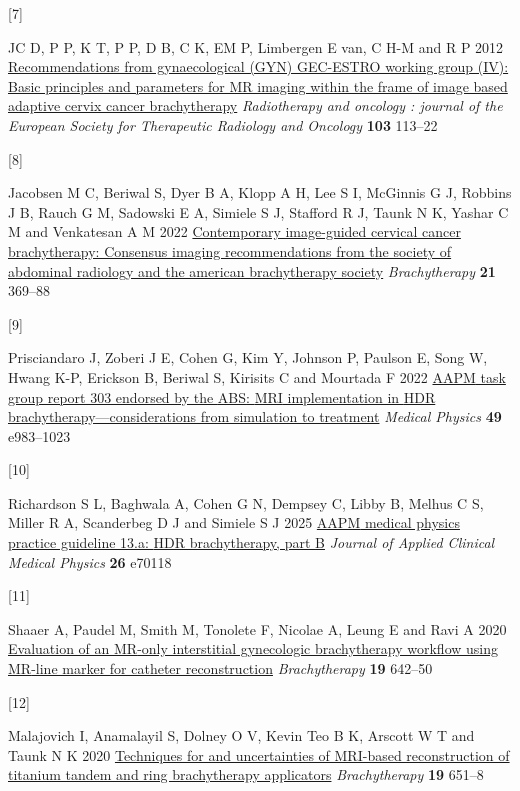 \documentclass[
  11pt,
]{article}
\newlength{\cslhangindent}
\newlength{\csllabelwidth}
\newenvironment{CSLReferences}[2] %
 {\begin{list}{}{%
  \setlength{\itemindent}{0pt}
  \setlength{\leftmargin}{0pt}
  \setlength{\parsep}{0pt}
  \ifodd #1
   \setlength{\leftmargin}{\cslhangindent}
   \setlength{\itemindent}{-1\cslhangindent}
  \fi
  \setlength{\itemsep}{#2\baselineskip}}}
 {\end{list}}
\newcommand{\CSLLeftMargin}[1]{\parbox[t]{\csllabelwidth}{\strut#1\strut}}
\newcommand{\CSLRightInline}[1]{\parbox[t]{\linewidth - \csllabelwidth}{\strut#1\strut}}
\begin{document}
\begin{CSLReferences}{0}{1}
\CSLLeftMargin{{[}7{]} }%
\CSLRightInline{JC D, P P, K T, P P, D B, C K, EM P, Limbergen E van, C
H-M and R P 2012
\href{https://doi.org/10.1016/j.radonc.2011.12.024}{Recommendations from
gynaecological (GYN) GEC-ESTRO working group (IV): Basic principles and
parameters for MR imaging within the frame of image based adaptive
cervix cancer brachytherapy} \emph{Radiotherapy and oncology : journal
of the European Society for Therapeutic Radiology and Oncology}
\textbf{103} 113--22}

\CSLLeftMargin{{[}8{]} }%
\CSLRightInline{Jacobsen M C, Beriwal S, Dyer B A, Klopp A H, Lee S I,
McGinnis G J, Robbins J B, Rauch G M, Sadowski E A, Simiele S J,
Stafford R J, Taunk N K, Yashar C M and Venkatesan A M 2022
\href{https://doi.org/10.1016/j.brachy.2022.04.005}{Contemporary
image-guided cervical cancer brachytherapy: Consensus imaging
recommendations from the society of abdominal radiology and the american
brachytherapy society} \emph{Brachytherapy} \textbf{21} 369--88}

\CSLLeftMargin{{[}9{]} }%
\CSLRightInline{Prisciandaro J, Zoberi J E, Cohen G, Kim Y, Johnson P,
Paulson E, Song W, Hwang K-P, Erickson B, Beriwal S, Kirisits C and
Mourtada F 2022 \href{https://doi.org/10.1002/mp.15713}{{AAPM} task
group report 303 endorsed by the {ABS}: {MRI} implementation in {HDR}
brachytherapy---considerations from simulation to treatment}
\emph{Medical Physics} \textbf{49} e983--1023}

\CSLLeftMargin{{[}10{]} }%
\CSLRightInline{Richardson S L, Baghwala A, Cohen G N, Dempsey C, Libby
B, Melhus C S, Miller R A, Scanderbeg D J and Simiele S J 2025
\href{https://doi.org/10.1002/acm2.70118}{{AAPM} medical physics
practice guideline 13.a: {HDR} brachytherapy, part {B}} \emph{Journal of
Applied Clinical Medical Physics} \textbf{26} e70118}

\CSLLeftMargin{{[}11{]} }%
\CSLRightInline{Shaaer A, Paudel M, Smith M, Tonolete F, Nicolae A,
Leung E and Ravi A 2020
\href{https://doi.org/10.1016/j.brachy.2020.06.007}{Evaluation of an
{MR}-only interstitial gynecologic brachytherapy workflow using
{MR}-line marker for catheter reconstruction} \emph{Brachytherapy}
\textbf{19} 642--50}

\CSLLeftMargin{{[}12{]} }%
\CSLRightInline{Malajovich I, Anamalayil S, Dolney O V, Kevin Teo B K,
Arscott W T and Taunk N K 2020
\href{https://doi.org/10.1016/j.brachy.2020.05.005}{Techniques for and
uncertainties of MRI-based reconstruction of titanium tandem and ring
brachytherapy applicators} \emph{Brachytherapy} \textbf{19} 651--8}


\end{CSLReferences}
\end{document}
